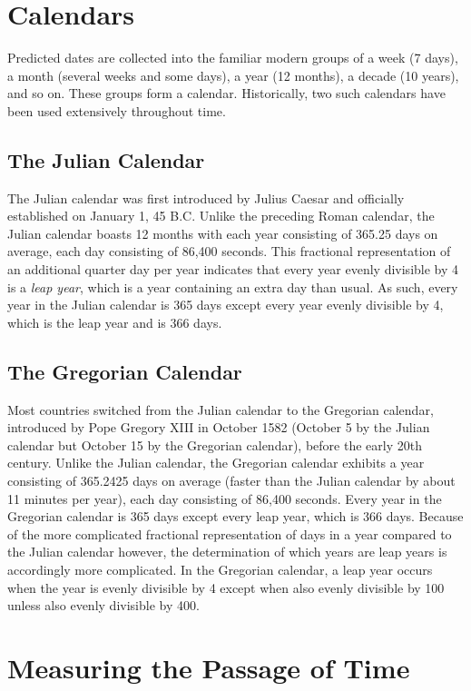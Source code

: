 \documentclass[11pt,dvipsnames]{thesis}
\begin{document}
\section{Calendars}
Predicted dates are collected into the familiar modern groups of a week (7 days), a month (several weeks and some days), a year (12 months), a decade (10 years), and so on. These groups form a calendar. Historically, two such calendars have been used extensively throughout time.

\subsection{The Julian Calendar}
The Julian calendar was first introduced by Julius Caesar and officially established on January 1, 45 B.C. Unlike the preceding Roman calendar, the Julian calendar boasts 12 months with each year consisting of 365.25 days on average, each day consisting of 86,400 seconds. This fractional representation of an additional quarter day per year indicates that every year evenly divisible by 4 is a \textit{leap year}, which is a year containing an extra day than usual. As such, every year in the Julian calendar is 365 days except every year evenly divisible by 4, which is the leap year and is 366 days.

\subsection{The Gregorian Calendar}
Most countries switched from the Julian calendar to the Gregorian calendar, introduced by Pope Gregory XIII in October 1582 (October 5 by the Julian calendar but October 15 by the Gregorian calendar), before the early 20th century. Unlike the Julian calendar, the Gregorian calendar exhibits a year consisting of 365.2425 days on average (faster than the Julian calendar by about 11 minutes per year), each day consisting of 86,400 seconds. Every year in the Gregorian calendar is 365 days except every leap year, which is 366 days. Because of the more complicated fractional representation of days in a year compared to the Julian calendar however, the determination of which years are leap years is accordingly more complicated. In the Gregorian calendar, a leap year occurs when the year is evenly divisible by 4 except when also evenly divisible by 100 unless also evenly divisible by 400.

\section{Measuring the Passage of Time}
\end{document}
